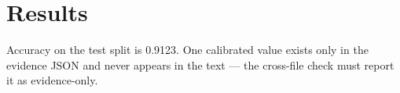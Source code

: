 \section{Results}
Accuracy on the test split is 0.9123. One calibrated value exists only in the
evidence JSON and never appears in the text — the cross-file check must report
it as evidence-only.
